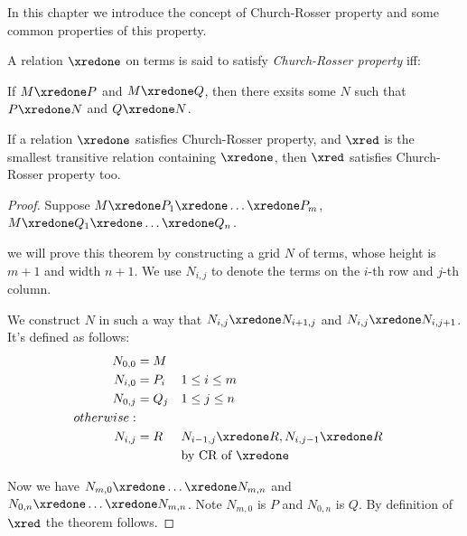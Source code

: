 \documentclass[../../../include/open-logic-section]{subfiles}
\begin{document}


In this chapter we introduce the concept of Church-Rosser property and
some common properties of this property.

\begin{defn}
  A relation $\xredone$ on terms is said to satisfy \emph{Church-Rosser
    property} iff:
  
  If $M \xredone P$ and $M \xredone Q$, then there exsits some $N$
  such that $P \xredone N$ and $Q \xredone N$.
\end{defn}

\begin{thm} 
  If a relation $\xredone$ satisfies Church-Rosser property, and $\xred$ is the
  smallest transitive relation containing $\xredone$, then $\xred$ satisfies
  Church-Rosser property too.
\end{thm}
\begin{proof}
  Suppose $M \xredone P_1 \xredone \ldots \xredone P_m$, $M \xredone Q_1
  \xredone \ldots \xredone Q_n$.
  
  we will prove this theorem by constructing a grid $N$ of terms, whose height is $m + 1$ and width $n + 1$. We use $N_{i,j}$ to denote the terms
  on the $i$-th row and $j$-th column.
  
  We construct $N$ in such a way that $N_{i,j} \xredone N_{i+1,j}$ and
  $N_{i,j} \xredone N_{i,j+1}$. It's defined as follows:
  \begin{align*}
    N_{0,0} &= M \\
    N_{i,0} &= P_i && 1 \le i \le m \\
    N_{0,j} &= Q_j && 1 \le j \le n \\
    otherwise: & \\
    N_{i,j} &= R && N_{i-1,j} \xredone R, N_{i,j-1} \xredone R \\
            & && \text{by CR of $\xredone$}
  \end{align*}

  Now we have $N_{m,0} \xredone \ldots \xredone N_{m,n}$ and $N_{0,n}
  \xredone \ldots \xredone N_{m,n}$. Note $N_{m,0}$ is $P$ and $N_{0,n}$
  is $Q$. By definition of $\xred$ the theorem follows.
\end{proof}
\end{document}
